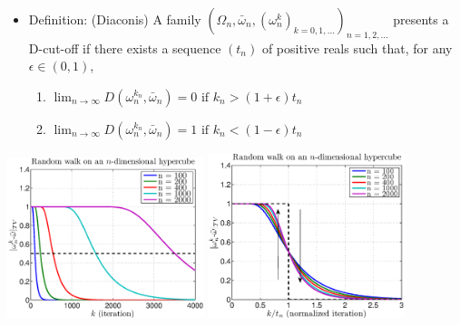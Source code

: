 \documentclass[12pt,t]{beamer}
\begin{document}
\begin{frame}
  \begin{itemize}
  \item Definition:\label{cutoffdefinition} (Diaconis) A family $(\Omega_n,\bar{\omega}_n, (\omega^k_n)_{k=0,1,...})_{n=1,2,...}$
   presents a D-cut-off if there exists a sequence $(t_n)$ of positive reals such that, for any $\epsilon \in(0,1)$,
  \begin{enumerate}
    \item $\lim_{n \rightarrow \infty}D(\omega^{k_n}_n,\bar{\omega}_n) = 0 \mbox{ if }
    k_n>(1+\epsilon)t_n$
    \item $\lim_{n \rightarrow \infty}D(\omega^{k_n}_n,\bar{\omega}_n) = 1 \mbox{ if }
    k_n<(1-\epsilon)t_n $
  \end{enumerate}
  \end{itemize}
\centerline{
\includegraphics[width=0.43\textwidth,trim=1cm 1cm 0cm 0cm]{rdwalk}
\includegraphics[width=0.43\textwidth,trim=1cm 1cm 0cm 0cm]{rdwalkn}
}


\end{frame}
\end{document}
